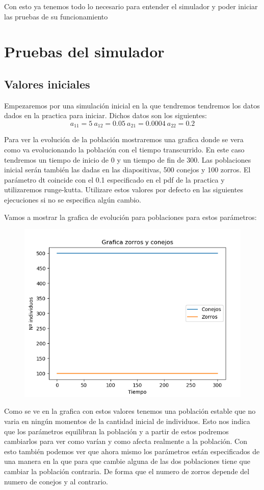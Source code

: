 \documentclass[]{article}
\begin{document}
Con esto ya tenemos todo lo necesario para entender el simulador y poder iniciar las pruebas de su funcionamiento
\newpage
\section{Pruebas del simulador}
\subsection{Valores iniciales}
Empezaremos por una simulación inicial en la que tendremos tendremos los datos dados en la practica para iniciar. Dichos datos son los siguientes: 
$$a_{11}=5\ a_{12}=0.05\ a_{21}=0.0004\ a_{22}=0.2$$

Para ver la evolución de la población mostraremos una grafica donde se vera como va evolucionando la población con el tiempo transcurrido. En este caso tendremos un tiempo de inicio de 0 y un tiempo de fin de 300. Las poblaciones inicial serán también las dadas en las diapositivas, 500 conejos y 100 zorros. El parámetro dt coincide con el 0.1 especificado en el pdf de la practica y utilizaremos runge-kutta. Utilizare estos valores por defecto en las siguientes ejecuciones si no se especifica algún cambio.

Vamos a mostrar la grafica de evolución para poblaciones para estos parámetros:
\begin{figure}[H]
	\centering
	\includegraphics[width=1\linewidth]{screenshot001}
\end{figure}

Como se ve en la grafica con estos valores tenemos una población estable que no varia en ningún momentos de la cantidad inicial de individuos. Esto nos indica que los parámetros equilibran la población y a partir de estos podremos cambiarlos para ver como varían y como afecta realmente a  la población. Con esto también podemos ver que ahora mismo los parámetros están especificados de una manera en la que para que cambie alguna de las dos poblaciones tiene que cambiar la población contraria. De forma que el numero de zorros depende del numero de conejos y al contrario.
\end{document}
